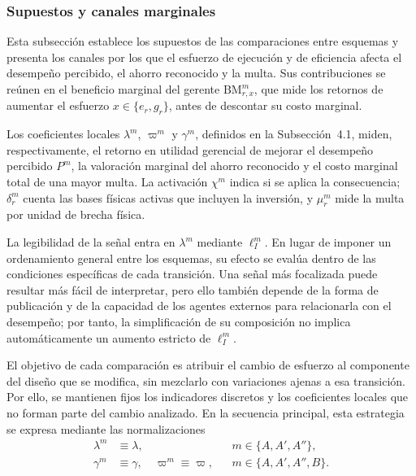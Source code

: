 \subsubsection{Supuestos y canales marginales}

Esta subsección establece los supuestos de las comparaciones entre esquemas y presenta los canales por los que el esfuerzo de ejecución y de eficiencia afecta el desempeño percibido, el ahorro reconocido y la multa. Sus contribuciones se reúnen en el beneficio marginal del gerente \(\mathrm{BM}_{r,x}^m\), que mide los retornos de aumentar el esfuerzo \(x\in\{e_r,g_r\}\), antes de descontar su costo marginal.

Los coeficientes locales \(\lambda^m\), \(\varpi^m\) y \(\gamma^m\), definidos en la Subsección~4.1, miden, respectivamente, el retorno en utilidad gerencial de mejorar el desempeño percibido \(P^m\), la valoración marginal del ahorro reconocido y el costo marginal total de una mayor multa. La activación \(\chi^m\) indica si se aplica la consecuencia; \(\delta_r^m\) cuenta las bases físicas activas que incluyen la inversión, y \(\mu_r^m\) mide la multa por unidad de brecha física.

La legibilidad de la señal entra en \(\lambda^m\) mediante \(\ell_I^m\). En lugar de imponer un ordenamiento general entre los esquemas, su efecto se evalúa dentro de las condiciones específicas de cada transición. Una señal más focalizada puede resultar más fácil de interpretar, pero ello también depende de la forma de publicación y de la capacidad de los agentes externos para relacionarla con el desempeño; por tanto, la simplificación de su composición no implica automáticamente un aumento estricto de \(\ell_I^m\).

El objetivo de cada comparación es atribuir el cambio de esfuerzo al componente del diseño que se modifica, sin mezclarlo con variaciones ajenas a esa transición. Por ello, se mantienen fijos los indicadores discretos y los coeficientes locales que no forman parte del cambio analizado. En la secuencia principal, esta estrategia se expresa mediante las normalizaciones
\begin{equation}
\label{eq:normalizaciones_locales}
\begin{aligned}
\lambda^m &\equiv \lambda,
&& m\in\{A,A',A''\},
\\
\gamma^m &\equiv \gamma,\quad \varpi^m\equiv\varpi,
&& m\in\{A,A',A'',B\}.
\end{aligned}
\end{equation}

